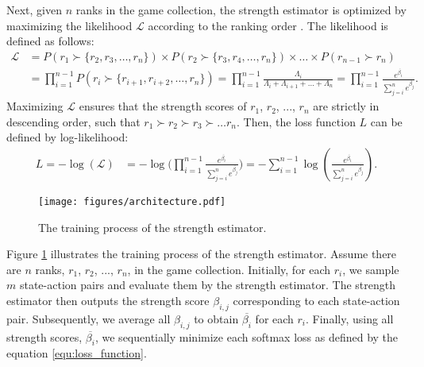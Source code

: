 Next, given $n$ ranks in the game collection, the strength estimator is optimized by maximizing the likelihood $\mathcal{L}$ according to the ranking order \citep{xia_listwise_2008,chen_ranking_2009}.
The likelihood is defined as follows:
\begin{align}
\label{equ:likelihood}
    \mathcal{L} &= P(r_1\succ\{r_2, r_3, \ldots, r_n\}) \times P(r_2\succ\{r_3, r_4, \ldots, r_n\}) \times \ldots \times P(r_{n-1}\succ r_n)\nonumber\\
                &= \prod_{i=1}^{n-1} P(r_i \succ \{r_{i+1}, r_{i+2}, \ldots, r_{n}\})
                = \prod_{i=1}^{n-1} \frac{\Lambda_{i}}{\Lambda_{i} + \Lambda_{i+1} + \ldots + \Lambda_{n}}
                = \prod_{i=1}^{n-1}\frac{e^{\overline{\beta_i}}}{\sum_{j=i}^{n}e^{\overline{\beta_j}}}.
\end{align}
Maximizing $\mathcal{L}$ ensures that the strength scores of $r_1$, $r_2$, ..., $r_n$ are strictly in descending order, such that $r_1 \succ r_2 \succ r_3 \succ \ldots r_n$.
Then, the loss function $L$ can be defined by log-likelihood:
\begin{align}
\label{equ:loss_function}
    L = -\log(\mathcal{L}) &= -\log\biggl(\prod_{i=1}^{n-1}\frac{e^{\overline{\beta_i}}}{\sum_{j=i}^{n}e^{\overline{\beta_j}}}\bigg)
    = -\sum_{i=1}^{n-1}\log(\frac{e^{\overline{\beta_i}}}{\sum_{j=i}^{n}e^{\overline{\beta_j}}}).
\end{align}

\begin{figure}[t]
\centering
\texttt{[image: figures/architecture.pdf]}
\caption{The training process of the strength estimator.}
\label{fig:architecture}
\end{figure}

Figure \ref{fig:architecture} illustrates the training process of the strength estimator.
Assume there are $n$ ranks, $r_1$, $r_2$, ..., $r_n$, in the game collection.
Initially, for each $r_i$, we sample $m$ state-action pairs and evaluate them by the strength estimator.
The strength estimator then outputs the strength score $\beta_{i,j}$ corresponding to each state-action pair.
Subsequently, we average all $\beta_{i,j}$ to obtain $\overline{\beta_i}$ for each $r_i$.
Finally, using all strength scores, $\overline{\beta_i}$, we sequentially minimize each softmax loss as defined by the equation \ref{equ:loss_function}.

